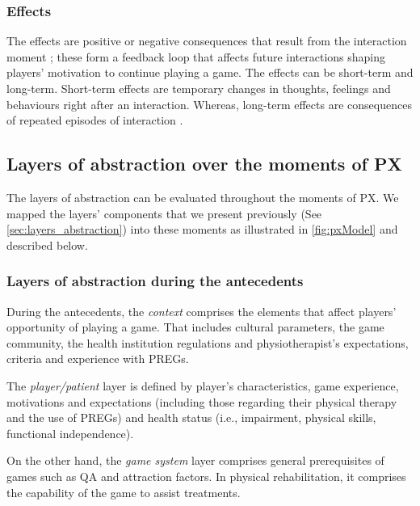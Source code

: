 \subsubsection{Effects}
The effects are positive or negative consequences that result from the interaction moment \autocite{Fernandez2008}; these form a feedback loop that affects future interactions \autocite{Nacked,Elson2014} shaping players' motivation to continue playing a game. The effects can be short-term and long-term. Short-term effects are temporary changes in thoughts, feelings and behaviours right after an interaction. Whereas, long-term effects are consequences of repeated episodes of interaction \autocite{Elson2014}.

\subsection{Layers of abstraction over the moments of \ac{PX}}
\label{sec:rel_among_dimensions}
The layers of abstraction can be evaluated throughout the moments of \ac{PX}. We mapped the layers' components that we present previously (See \autoref{sec:layers_abstraction}) into these moments as illustrated in \autoref{fig:pxModel} and described below.

\subsubsection{Layers of abstraction during the antecedents}
During the antecedents, the \textit{context} comprises the elements that affect players' opportunity of playing a game. That includes cultural parameters, the game community, the health institution regulations and physiotherapist's expectations, criteria and experience with \acp{PREG}.

The \textit{player/patient} layer is defined by player's characteristics, game experience, motivations and expectations (including those regarding their physical therapy and the use of \acp{PREG}) and health status (i.e., impairment, physical skills, functional independence). 

On the other hand, the \textit{game system} layer comprises general prerequisites of games such as \ac{QA} and attraction factors. In physical rehabilitation, it comprises the capability of the game to assist treatments.

